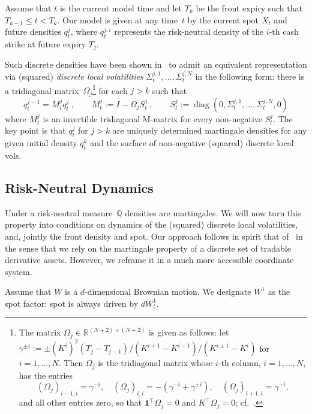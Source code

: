 \documentclass[11pt]{article}
\newcommand{\Q}{\mathbb Q}
\newcommand{\one}{\mathbf 1}
\theoremstyle{plain}
\theoremstyle{definition}
\theoremstyle{remark}
\begin{document}
Assume that $t$ is the current model time and let $T_k$ be the front expiry such that $T_{k-1}\leq t<T_k$.
Our model is given at any time~$t$
by the current spot $X_t$ and future densities $q_t^j$, where $q_t^{j,i}$ represents the risk-neutral density of the $i$-th cash strike at future expiry $T_j$.

Such discrete densities have been shown in~\cite{DLV} to admit an equivalent representation via (squared) \emph{discrete local volatilities} $\Sigma_t^{j,1},\ldots,\Sigma_t^{j,N}$ in the following form:
there is a tridiagonal matrix~$\Omega_j$\footnote{
  The matrix $\Omega_j\in\mathbb R^{(N+2)\times(N+2)}$ is given as follows: 
  let $\gamma^{\pm i} := \pm (K^{i})^2 (T_j-T_{j-1}) / (K^{i+1}-K^{i-1}) / (K^{i\pm 1} - K^i) $ for $i=1,\ldots,N$.
  Then $\Omega_j$ is the tridiagonal matrix whose $i$-th column, $i=1,\ldots,N$, has the entries
  \[
    (\Omega_j)_{i-1,i} = \gamma^{-i},\quad
    (\Omega_j)_{i,i} = -(\gamma^{-i}+\gamma^{+i}),\quad
    (\Omega_j)_{i+1,i} = \gamma^{+i},
  \]
  and all other entries zero, so that $\one^{\!\top}\Omega_j=0$ and $K^{\!\top}\Omega_j=0$;
  cf.~\cite{SANOS2026}.
 } for each $j>k$ such that
    \begin{equation}
      q_t^{j-1}=M_t^jq_t^j \ ,
      \qquad
      M_t^j:=I-\Omega_jS_t^j \ ,
      \qquad
      S_t^j:=\operatorname{diag}(0,\Sigma_t^{j,1},\ldots,
        \Sigma_t^{j,N},0) 
      \label{eq:hb_dlv}
    \end{equation}
where $M^j_t$ is an invertible tridiagonal M-matrix for every non-negative $S_t^j$. The key point is that $q_t^j$ for $j>k$ are uniquely determined martingale densities
for any given initial density $q_t^k$ and the surface of non-negative (squared) discrete local vols.


  \subsection{Risk-Neutral Dynamics}

Under a risk-neutral measure~$\Q$ densities are martingales. We will now turn this property into conditions on dynamics of the (squared) discrete local volatilities, and, 
jointly the front density and spot. 
      Our approach follows in spirit that of~\cite{Wissel2007} in the sense that we rely on the martingale property of a discrete set of tradable derivative assets.
      However, we reframe it in a much more accessible coordinate system.

Assume that $W$ is a $d$-dimensional Brownian motion. We designate $W^1$ as the
      spot factor: spot is always driven by $dW_t^1$.
\end{document}
